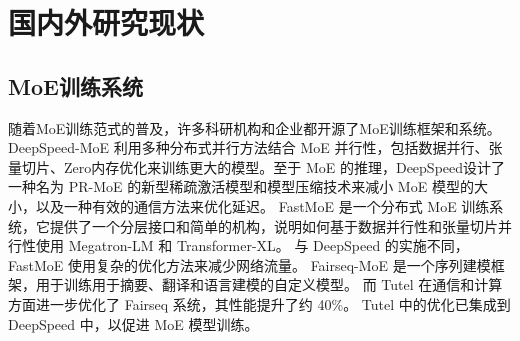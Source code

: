 \section{国内外研究现状}

\subsection{MoE训练系统}
随着MoE训练范式的普及，许多科研机构和企业都开源了MoE训练框架和系统。 
% 
DeepSpeed-MoE 利用多种分布式并行方法结合 MoE 并行性，包括数据并行、张量切片、Zero内存优化来训练更大的模型。至于 MoE 的推理，DeepSpeed设计了一种名为 PR-MoE 的新型稀疏激活模型和模型压缩技术来减小 MoE 模型的大小，以及一种有效的通信方法来优化延迟。 
% 
FastMoE 是一个分布式 MoE 训练系统，它提供了一个分层接口和简单的机构，说明如何基于数据并行性和张量切片并行性使用 Megatron-LM 和 Transformer-XL。
% 
与 DeepSpeed 的实施不同，FastMoE 使用复杂的优化方法来减少网络流量。
% 
Fairseq-MoE  是一个序列建模框架，用于训练用于摘要、翻译和语言建模的自定义模型。
% 
而 Tutel 在通信和计算方面进一步优化了 Fairseq 系统，其性能提升了约 40\%。
Tutel 中的优化已集成到 DeepSpeed 中，以促进 MoE 模型训练。

